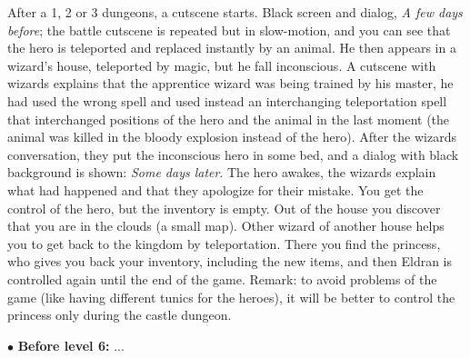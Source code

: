\documentclass[12pt,a4paper]{report}
\begin{document}
\indent After a 1, 2 or 3 dungeons, a cutscene starts. Black screen and dialog, \textit{A few days before}; the battle cutscene is repeated
but in slow-motion, and you can see that the hero is teleported and replaced instantly by an animal. He then appears in a wizard's house,
teleported by magic, but he fall inconscious. A cutscene with wizards explains that the apprentice wizard was being trained by his master, he had used the wrong spell and used instead an interchanging teleportation spell that interchanged positions of the hero and the animal in
the last moment (the animal was killed in the bloody explosion instead of the hero). After the wizards conversation, they put the inconscious hero in some bed, and a dialog with black background is shown: \textit{Some days later}. The hero awakes, the wizards explain
what had happened and that they apologize for their mistake. You get the control of the hero, but the inventory is empty. Out of the house you discover that you are in the clouds (a small map). Other wizard of another house helps you to get back to the kingdom by teleportation.
There you find the princess, who gives you back your inventory, including the new items, and then Eldran is controlled again until the end of the game. Remark: to avoid problems of the game (like having different tunics for the heroes), it will be better to control the princess
only during the castle dungeon.

$\bullet$ \textbf{Before level 6:} ... \\


\end{document}
